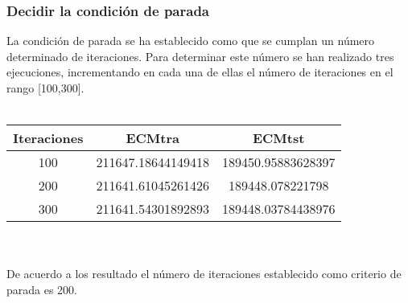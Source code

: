 \documentclass[12pt,a4paper]{article}
\begin{document}
\subsubsection{Decidir la condición de parada}
La condición de parada se ha establecido como que se cumplan un número determinado de iteraciones. Para determinar este número se han realizado tres ejecuciones, incrementando en cada una de ellas el número de iteraciones en el rango [100,300].\\\\

\begin{tabular}{|c|c|c|}
\hline 
Iteraciones & ECMtra & ECMtst \\ 
\hline 
100 & 211647.18644149418 & 189450.95883628397 \\ 
\hline 
200 & 211641.61045261426 & 189448.078221798 \\ 
\hline 
300 & 211641.54301892893 & 189448.03784438976 \\ 
\hline 
\end{tabular} 
~\\
~\\
De acuerdo a los resultado el número de iteraciones establecido como criterio de parada es 200.
\end{document}
